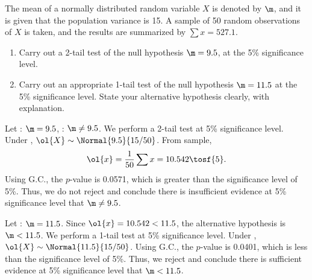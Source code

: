 \begin{problem}
    The mean of a normally distributed random variable $X$ is denoted by $\m$, and it is given that the population variance is 15. A sample of 50 random observations of $X$ is taken, and the results are summarized by $\sum x= 527.1$.

    \begin{enumerate}
        \item Carry out a 2-tail test of the null hypothesis $\m=9.5$, at the 5\% significance level.
        \item Carry out an appropriate 1-tail test of the null hypothesis $\m=11.5$ at the 5\% significance level. State your alternative hypothesis clearly, with explanation.
    \end{enumerate}
\end{problem}
\begin{solution}
    \begin{ppart}
        Let \nullhyp: $\m = 9.5$, \althyp: $\m \neq 9.5$. We perform a 2-tail test at 5\% significance level. Under \nullhyp, $\ol{X} \sim \Normal{9.5}{15/50}$. From sample, \[\ol{x} = \frac1{50} \sum x = 10.542 \tosf{5}.\] Using G.C., the $p$-value is 0.0571, which is greater than the significance level of 5\%. Thus, we do not reject \nullhyp{} and conclude there is insufficient evidence at 5\% significance level that $\m \neq 9.5$.
    \end{ppart}
    \begin{ppart}
        Let \nullhyp: $\m = 11.5$. Since $\ol{x} = 10.542 < 11.5$, the alternative hypothesis \althyp is $\m < 11.5$. We perform a 1-tail test at 5\% significance level. Under \nullhyp, $\ol{X} \sim \Normal{11.5}{15/50}$. Using G.C., the $p$-value is 0.0401, which is less than the significance level of 5\%. Thus, we reject \nullhyp{} and conclude there is sufficient evidence at 5\% significance level that $\m < 11.5$.
    \end{ppart}
\end{solution}

